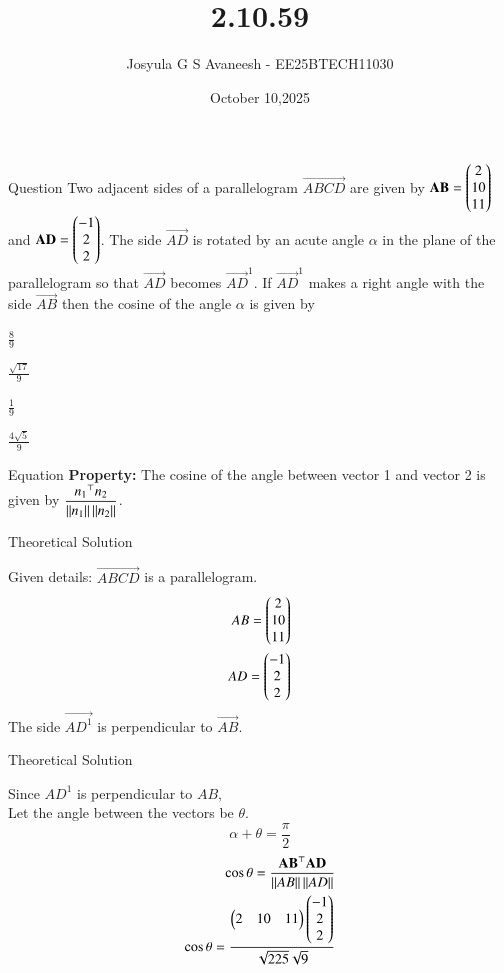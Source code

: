 \documentclass{beamer}
\title %
{2.10.59}
\date{October 10,2025}
\author 
{Josyula G S Avaneesh - EE25BTECH11030}
\begin{document}
\frame{\titlepage}
\begin{frame}{Question}
Two adjacent sides of a parallelogram $\vec{ABCD}$ are given by $\mathbf{AB}=\begin{pmatrix}2\\10\\11\end{pmatrix}$ and $\mathbf{AD}=\begin{pmatrix}-1\\2\\2\end{pmatrix}$. The side $\vec{AD}$ is rotated by an acute angle $\alpha$ in the plane of the parallelogram so that $\vec{AD}$ becomes $\vec{AD}^1$. If $\vec{AD}^1$ makes a right angle with the side $\vec{AB}$ then the cosine of the angle $\alpha$ is given by\\
\begin{enumerate}
\begin{multicols}{2}
    \item $\frac{8}{9}$
    \item $\frac{\sqrt{17}}{9}$
    \item $\frac{1}{9}$
    \item $\frac{4 \sqrt{5}}{9}$
\end{multicols}
\end{enumerate}
\end{frame}



\begin{frame}{Equation}
\textbf{Property:} The cosine of the angle between vector 1 and vector 2 is given by $\dfrac{{n_1}^\top n_2}{\left\lVert n_1\right\rVert\left\lVert n_2\right\rVert} $.
\end{frame}
\begin{frame}{Theoretical Solution}

Given details:
$\vec{ABCD}$ is a parallelogram.
\begin{align}
   AB=\begin{pmatrix}2\\10\\11\end{pmatrix}\\
   AD=\begin{pmatrix}-1\\2\\2\end{pmatrix}
\end{align}
The side $\vec{AD^1}$ is perpendicular to $\vec{AB}$.
\end{frame}

\begin{frame}{Theoretical Solution}

Since $AD^1$ is perpendicular to $AB$,\\


Let the angle between the vectors be $\theta$.
$$\alpha+\theta=\frac{\pi}{2}$$
\begin{align}
  \cos\theta=\frac{\mathbf{AB}^\top\mathbf{AD}}{\left\lVert AB\right\rVert\left\lVert AD\right\rVert}\\
  \cos\theta=\frac{\begin{pmatrix}2&10&11\end{pmatrix}\begin{pmatrix}-1\\2\\2\end{pmatrix}}{\sqrt{225}\sqrt{9}}
\end{align}
\end{frame}
\end{document}
